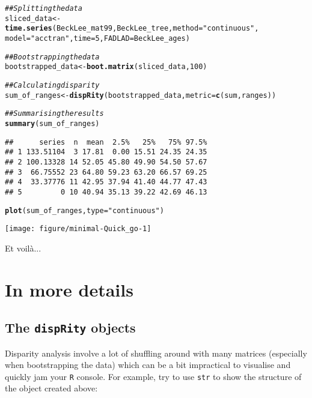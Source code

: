 \documentclass{article}\usepackage[]{graphicx}\usepackage[]{color}
\makeatletter
\newcommand{\hlnum}[1]{\textcolor[rgb]{0.686,0.059,0.569}{#1}}%
\newcommand{\hlstr}[1]{\textcolor[rgb]{0.192,0.494,0.8}{#1}}%
\newcommand{\hlcom}[1]{\textcolor[rgb]{0.678,0.584,0.686}{\textit{#1}}}%
\newcommand{\hlstd}[1]{\textcolor[rgb]{0.345,0.345,0.345}{#1}}%
\newcommand{\hlkwb}[1]{\textcolor[rgb]{0.69,0.353,0.396}{#1}}%
\newcommand{\hlkwc}[1]{\textcolor[rgb]{0.333,0.667,0.333}{#1}}%
\newcommand{\hlkwd}[1]{\textcolor[rgb]{0.737,0.353,0.396}{\textbf{#1}}}%
\newenvironment{kframe}{%
 \def\at@end@of@kframe{}%
 \ifinner\ifhmode%
  \def\at@end@of@kframe{\end{minipage}}%
  \begin{minipage}{\columnwidth}%
 \fi\fi%
 \def\FrameCommand##1{\hskip\@totalleftmargin \hskip-\fboxsep
 \colorbox{shadecolor}{##1}\hskip-\fboxsep
     \hskip-\linewidth \hskip-\@totalleftmargin \hskip\columnwidth}%
 \MakeFramed {\advance\hsize-\width
   \@totalleftmargin\z@ \linewidth\hsize
   \@setminipage}}%
 {\par\unskip\endMakeFramed%
 \at@end@of@kframe}
\newenvironment{knitrout}{}{} %
\newcommand{\dispRity}{\texttt{dispRity} }
\newcommand{\R}{\texttt{R} }
\makeatother
\begin{document}
\begin{knitrout}
\color{fgcolor}\begin{kframe}
\begin{alltt}
\hlcom{## Splitting the data}
\hlstd{sliced_data} \hlkwb{<-} \hlkwd{time.series}\hlstd{(BeckLee_mat99, BeckLee_tree,} \hlkwc{method} \hlstd{=} \hlstr{"continuous"}\hlstd{,}
    \hlkwc{model} \hlstd{=} \hlstr{"acctran"}\hlstd{,} \hlkwc{time} \hlstd{=} \hlnum{5}\hlstd{,} \hlkwc{FADLAD} \hlstd{= BeckLee_ages)}
\end{alltt}


{\ttfamily\noindent\itshape\color{messagecolor}{\#\# Some tips have FAD/LAD and are assumed to interval single points in time.}}\begin{alltt}
\hlcom{## Bootstrapping the data}
\hlstd{bootstrapped_data} \hlkwb{<-} \hlkwd{boot.matrix}\hlstd{(sliced_data,} \hlnum{100}\hlstd{)}

\hlcom{## Calculating disparity}
\hlstd{sum_of_ranges} \hlkwb{<-} \hlkwd{dispRity}\hlstd{(bootstrapped_data,} \hlkwc{metric} \hlstd{=} \hlkwd{c}\hlstd{(sum, ranges))}

\hlcom{## Summarising the results}
\hlkwd{summary}\hlstd{(sum_of_ranges)}
\end{alltt}
\begin{verbatim}
##      series  n  mean  2.5%   25%   75% 97.5%
## 1 133.51104  3 17.81  0.00 15.51 24.35 24.35
## 2 100.13328 14 52.05 45.80 49.90 54.50 57.67
## 3  66.75552 23 64.80 59.23 63.20 66.57 69.25
## 4  33.37776 11 42.95 37.94 41.40 44.77 47.43
## 5         0 10 40.94 35.13 39.22 42.69 46.13
\end{verbatim}
\begin{alltt}
\hlkwd{plot}\hlstd{(sum_of_ranges,} \hlkwc{type} \hlstd{=} \hlstr{"continuous"}\hlstd{)}
\end{alltt}
\end{kframe}

{\centering \texttt{[image: figure/minimal-Quick\_go-1]} 

}



\end{knitrout}

Et voil\`{a}...

\section{In more details}

\subsection{The \dispRity objects}
Disparity analysis involve a lot of shuffling around with many matrices (especially when bootstrapping the data) which can be a bit impractical to visualise and quickly jam your \R console.
For example, try to use \texttt{str} to show the structure of the object created above:
\end{document}
